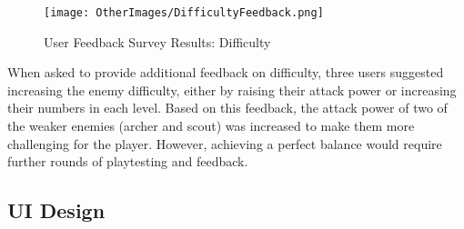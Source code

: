 \documentclass[10pt]{final_report}
\begin{document}
\begin{figure}[H]
    \centering
    \texttt{[image: OtherImages/DifficultyFeedback.png]}
    \caption{User Feedback Survey Results: Difficulty}
    \label{fig:label_difficultyfeedback}
\end{figure}

When asked to provide additional feedback on difficulty, three users suggested increasing the enemy difficulty, either by raising their attack power or increasing their numbers in each level. Based on this feedback, the attack power of two of the weaker enemies (archer and scout) was increased to make them more challenging for the player. However, achieving a perfect balance would require further rounds of playtesting and feedback.

\subsection{UI Design}\label{UIDesign}
\end{document}
